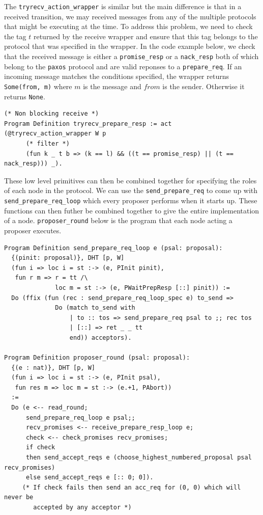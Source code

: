 The \texttt{tryrecv\_action\_wrapper} is similar but the main difference is that in
a received transition, we may received messages from any of the multiple protocols
that might be executing at the time. To address this problem, we need to check the
tag $t$ returned by the receive wrapper and ensure that this tag belongs to the
protocol that was specified in the wrapper. In the code example below, we check
that the received message is either a \texttt{promise\_resp} or a \texttt{nack\_resp}
both of which belong to the \texttt{paxos} protocol and are valid reponses to a
\texttt{prepare\_req}.
If an incoming message matches the conditions specified, the wrapper returns
\texttt{Some(from, m)} where $m$ is the message and $from$ is the sender. Otherwise
it returns \texttt{None}.

\begin{lstlisting}
(* Non blocking receive *)
Program Definition tryrecv_prepare_resp := act (@tryrecv_action_wrapper W p
      (* filter *)
      (fun k _ t b => (k == l) && ((t == promise_resp) || (t == nack_resp))) _).
\end{lstlisting}

These low level primitives can then be combined together for specifying the roles
of each node in the protocol. We can use the \texttt{send\_prepare\_req} to
come up with \texttt{send\_prepare\_req\_loop} which every proposer performs when
it starts up. These functions can then futher be combined together to give the
entire implementation of a node. \texttt{proposer\_round} below is the program
that each node acting a proposer executes.

\begin{lstlisting}
Program Definition send_prepare_req_loop e (psal: proposal):
  {(pinit: proposal)}, DHT [p, W]
  (fun i => loc i = st :-> (e, PInit pinit),
   fun r m => r = tt /\
              loc m = st :-> (e, PWaitPrepResp [::] pinit)) :=
  Do (ffix (fun (rec : send_prepare_req_loop_spec e) to_send =>
              Do (match to_send with
                  | to :: tos => send_prepare_req psal to ;; rec tos
                  | [::] => ret _ _ tt
                  end)) acceptors).

Program Definition proposer_round (psal: proposal):
  {(e : nat)}, DHT [p, W]
  (fun i => loc i = st :-> (e, PInit psal),
   fun res m => loc m = st :-> (e.+1, PAbort))
  :=
  Do (e <-- read_round;
      send_prepare_req_loop e psal;;
      recv_promises <-- receive_prepare_resp_loop e;
      check <-- check_promises recv_promises;
      if check
      then send_accept_reqs e (choose_highest_numbered_proposal psal recv_promises)
      else send_accept_reqs e [:: 0; 0]).
     (* If check fails then send an acc_req for (0, 0) which will never be
        accepted by any acceptor *)
\end{lstlisting}

